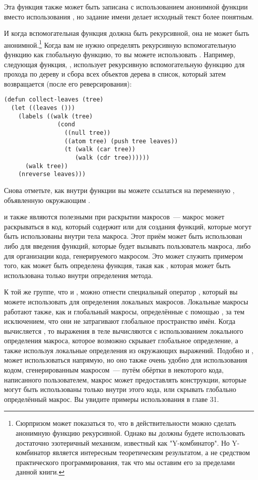 Эта функция также может быть записана с использованием анонимной функции вместо
использования , но задание имени делает исходный текст более понятным.

И когда вспомогательная функция должна быть рекурсивной, она не может быть
анонимной.\footnote{Сюрпризом может показаться то, что в действительности можно сделать
  анонимную функцию рекурсивной.  Однако вы должны будете использовать достаточно
  эзотеричный механизм, известный как "Y-комбинатор".  Но Y-комбинатор является интересным
  теоретическим результатом, а не средством практического программирования, так что мы
  оставим его за пределами данной книги.}  Когда вам не нужно определять рекурсивную
вспомогательную функцию как глобальную функцию, то вы можете использовать .
Например, следующая функция, , использует рекурсивную вспомогательную
функцию  для прохода по дереву и сбора всех объектов дерева в список, который
затем возвращается  (после его реверсирования):

\begin{lstlisting}
(defun collect-leaves (tree)
  (let ((leaves ()))
    (labels ((walk (tree)
               (cond
                 ((null tree))
                 ((atom tree) (push tree leaves))
                 (t (walk (car tree))
                    (walk (cdr tree))))))
      (walk tree))
    (nreverse leaves)))
\end{lstlisting}


Снова отметьте, как внутри функции  вы можете ссылаться на переменную
, объявленную окружающим .

 и  также являются полезными при раскрытии макросов~--- макрос
может раскрываться в код, который содержит  или  для создания
функций, которые могут быть использованы внутри тела макроса.  Этот приём может быть
использован либо для введения функций, которые будет вызывать пользователь макроса, либо
для организации кода, генерируемого макросом.  Это может служить примером того, как может
быть определена функция, такая как , которая может быть
использована только внутри определения метода.

К той же группе, что  и , можно отнести специальный оператор
, который вы можете использовать для определения локальных
макросов. Локальные макросы работают также, как и глобальный макросы, определённые с
помощью , за тем исключением, что они не затрагивают глобальное
пространство имён.  Когда вычисляется , то выражения в теле вычисляются с
использованием локального определения макроса, которое возможно скрывает глобальное
определение, а также используя локальные определения из окружающих выражений.  Подобно
 и ,  может использоваться напрямую, но оно также
очень удобно для использования кодом, сгенерированным макросом~--- путём обёртки в
 некоторого кода, написанного пользователем, макрос может предоставлять
конструкции, которые могут быть использованы только внутри этого кода, или скрывать
глобально определённый макрос.  Вы увидите примеры использования  в главе
31.

